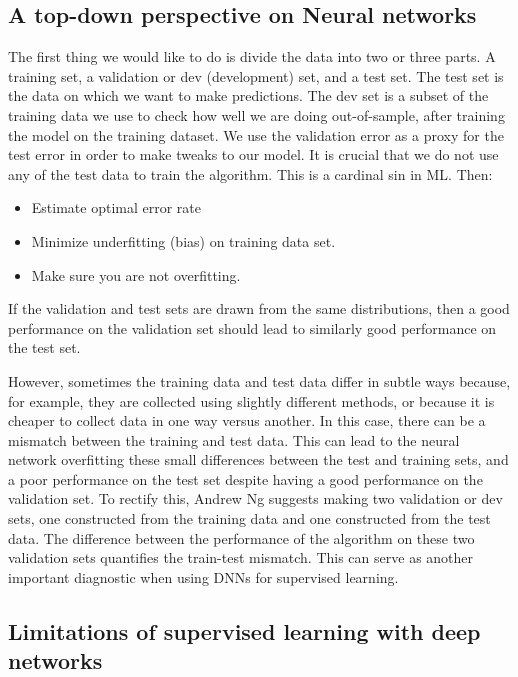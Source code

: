 \documentclass[%
oneside,                 %
final,                   %
10pt]{article}
\begin{document}
\subsection{A top-down perspective on Neural networks}

The first thing we would like to do is divide the data into two or
three parts. A training set, a validation or dev (development) set,
and a test set. The test set is the data on which we want to make
predictions. The dev set is a subset of the training data we use to
check how well we are doing out-of-sample, after training the model on
the training dataset. We use the validation error as a proxy for the
test error in order to make tweaks to our model. It is crucial that we
do not use any of the test data to train the algorithm. This is a
cardinal sin in ML. Then:

\begin{itemize}
\item Estimate optimal error rate

\item Minimize underfitting (bias) on training data set.

\item Make sure you are not overfitting.
\end{itemize}

\noindent
If the validation and test sets are drawn from the same distributions,
then a good performance on the validation set should lead to similarly
good performance on the test set. 

However, sometimes
the training data and test data differ in subtle ways because, for
example, they are collected using slightly different methods, or
because it is cheaper to collect data in one way versus another. In
this case, there can be a mismatch between the training and test
data. This can lead to the neural network overfitting these small
differences between the test and training sets, and a poor performance
on the test set despite having a good performance on the validation
set. To rectify this, Andrew Ng suggests making two validation or dev
sets, one constructed from the training data and one constructed from
the test data. The difference between the performance of the algorithm
on these two validation sets quantifies the train-test mismatch. This
can serve as another important diagnostic when using DNNs for
supervised learning.

\subsection{Limitations of supervised learning with deep networks}
\end{document}
